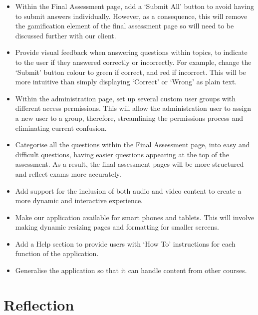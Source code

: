 \documentclass{l3proj}
\begin{document}
{\begin{itemize}
\item Within the Final Assessment page, add a `Submit All' button to avoid having to submit answers individually. However, as a consequence, this will remove the gamification element of the final assessment page so will need to be discussed further with our client.
\item Provide visual feedback when answering questions within topics, to indicate to the user if they answered correctly or incorrectly. For example, change the `Submit' button colour to green if correct, and red if incorrect. This will be more intuitive than simply displaying `Correct' or `Wrong' as plain text.
\item Within the administration page, set up several custom user groups with different access permissions. This will allow the administration user to assign a new user to a group, therefore, streamlining the permissions process and eliminating current confusion.
\item Categorise all the questions within the Final Assessment page, into easy and difficult questions, having easier questions appearing at the top of the assessment. As a result, the final assessment pages will be more structured and reflect exams more accurately.
\item Add support for the inclusion of both audio and video content to create a more dynamic and interactive experience.
\item Make our application available for smart phones and tablets. This will involve making dynamic resizing pages and formatting for smaller screens.
\item Add a Help section to provide users with `How To' instructions for each function of the application.
\item Generalise the application so that it can handle content from other courses. 
\end{itemize}

\section{Reflection}



}
\end{document}

